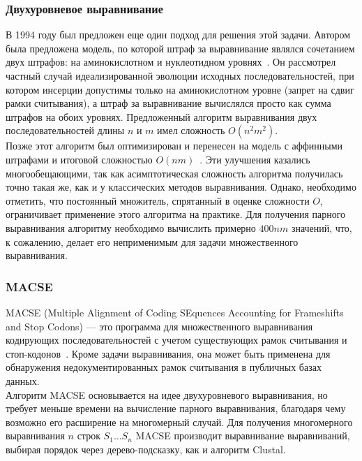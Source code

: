 \subsubsection[Двухуровневое выравнивание]{\large Двухуровневое выравнивание} \label{NTAAalign}
\hspace{\parindent} В 1994 году был предложен еще один подход для решения этой задачи. Автором была предложена модель, по которой штраф за выравнивание являлся сочетанием двух штрафов: на аминокислотном и нуклеотидном уровнях~\cite{Hein}. Он рассмотрел частный случай идеализированной эволюции исходных последовательностей, при котором инсерции допустимы только на аминокислотном уровне (запрет на сдвиг рамки считывания), а штраф за выравнивание вычислялся просто как сумма штрафов на обоих уровнях. Предложенный алгоритм выравнивания двух последовательностей длины $n$ и $m$ имел сложность $O(n^2m^2)$.\\
\indent Позже этот алгоритм был оптимизирован и перенесен на модель с аффинными штрафами и итоговой сложностью $O(nm)$~\cite{HeinOptimize}. Эти улучшения казались многообещающими, так как асимптотическая сложность алгоритма получилась точно такая же, как и у классических методов выравнивания. Однако, необходимо отметить, что постоянный множитель, спрятанный в оценке сложности $O$, ограничивает применение этого алгоритма на практике. Для получения парного выравнивания алгоритму необходимо вычислить примерно $400nm$ значений, что, к сожалению, делает его неприменимым для задачи множественного выравнивания.

\subsubsection[MACSE]{\large MACSE}
\hspace{\parindent} MACSE (Multiple Alignment of Coding SEquences Accounting for Frameshifts and Stop Codons) --- это программа для множественного выравнивания кодирующих последовательностей с учетом существующих рамок считывания и стоп-кодонов~\cite{MACSE}. Кроме задачи выравнивания, она может быть применена для обнаружения недокументированных рамок считывания в публичных базах данных.\\
\indent Алгоритм MACSE основывается на идее двухуровневого выравнивания, но требует меньше времени на вычисление парного выравнивания, благодаря чему возможно его расширение на многомерный случай. Для получения многомерного выравнивания $n$ строк $S_1 \ldots S_n$ MACSE производит выравнивание выравниваний, выбирая порядок через дерево-подсказку, как и алгоритм Clustal. 
